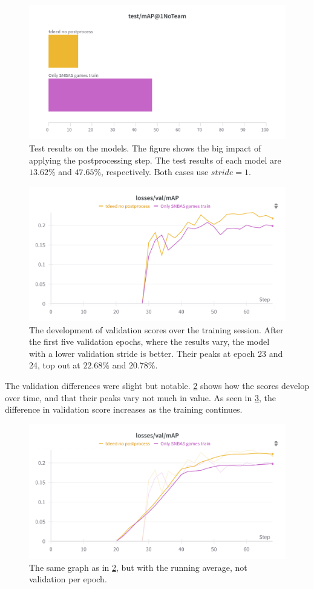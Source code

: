 \begin{figure}
    \centering
    \includegraphics[width=0.75\linewidth]{figures/no_pprocess_test.png}
    \caption{Test results on the models. The figure shows the big impact of applying the postprocessing step. The test results of each model are $13.62\%$ and $47.65\%$, respectively. Both cases use $stride=1$.}
    \label{fig:ex6:no_pp_test}
\end{figure}

\begin{figure}
    \centering
    \includegraphics[width=0.75\linewidth]{figures/no_pprocess_val.png}
    \caption{The development of validation scores over the training session. After the first five validation epochs, where the results vary, the model with a lower validation stride is better. Their peaks at epoch 23 and 24, top out at $22.68\%$ and $20.78\%$. }
        \label{fig:ex6:no_pp_val}
\end{figure}

The validation differences were slight but notable. \cref{fig:ex6:no_pp_val} shows how the scores develop over time, and that their peaks vary not much in value. As seen in \cref{fig:ex6:no_pp_avg_val}, the difference in validation score increases as the training continues. 

\begin{figure}
    \centering
    \includegraphics[width=0.75\linewidth]{figures/no_pprocess_avg_val.png}
    \caption{The same graph as in \cref{fig:ex6:no_pp_val}, but with the running average, not validation per epoch.}
    \label{fig:ex6:no_pp_avg_val}
\end{figure}

